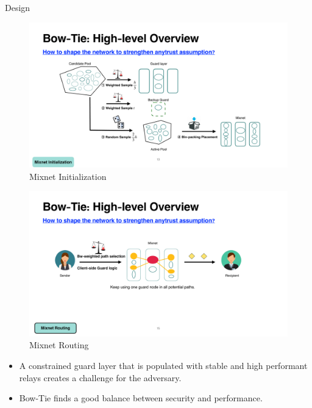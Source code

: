 \documentclass[final]{beamer}
\newlength{\rightcolwidth}
\begin{document}
\begin{frame}[t]
\begin{columns}[t]
\begin{column}{\rightcolwidth}
\begin{block}{Design}
    \begin{figure}[t]
    \includegraphics[width=0.95\rightcolwidth]{images/bowtie_init.pdf}
    \caption{Mixnet Initialization}
    \end{figure}
    \vspace{0.5cm}
    \begin{figure}[t]
    \includegraphics[width=0.95\rightcolwidth]{images/bowtie_routing.pdf}
    \caption{Mixnet Routing}
    \end{figure}
    \vspace{-1cm}
    \begin{itemize}
    \item A constrained guard layer that is populated with stable and high performant relays creates a challenge for the adversary.
    \item Bow-Tie finds a good balance between security and performance.
    \end{itemize}
  \end{block}



\end{column}
\end{columns}
\end{frame}
\end{document}
